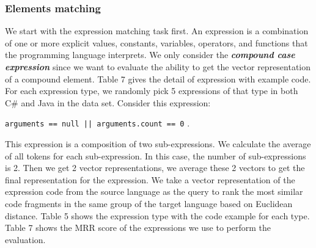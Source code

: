 \subsubsection{Elements matching}
We start with the expression matching task first. An expression is a combination of one or more explicit values, constants, variables, operators, and functions that the programming language interprets.
We only consider the \textbf{\textit{compound case expression}} since we want to evaluate the ability to get the vector representation of a compound element. Table 7 gives the detail of expression with example code. For each expression type, we randomly pick 5 expressions of that type in both C\# and Java in the data set. Consider this expression:

\texttt{arguments == null || arguments.count == 0} . 

This expression is a composition of two sub-expressions. We calculate the average of all tokens for each sub-expression. In this case, the number of sub-expressions is 2. Then we get 2 vector representations, we average these 2 vectors to get the final representation for the expression. We take a vector representation of the expression code from the source language as the query to rank the most similar code fragments in the same group of the target language based on Euclidean distance. Table 5 shows the expression type with the code example for each type. Table 7 shows the MRR score of the expressions we use to perform the evaluation.

\begin{table}
	
	\label{tab:freq}
	\caption{Expression types}	
\end{table}


